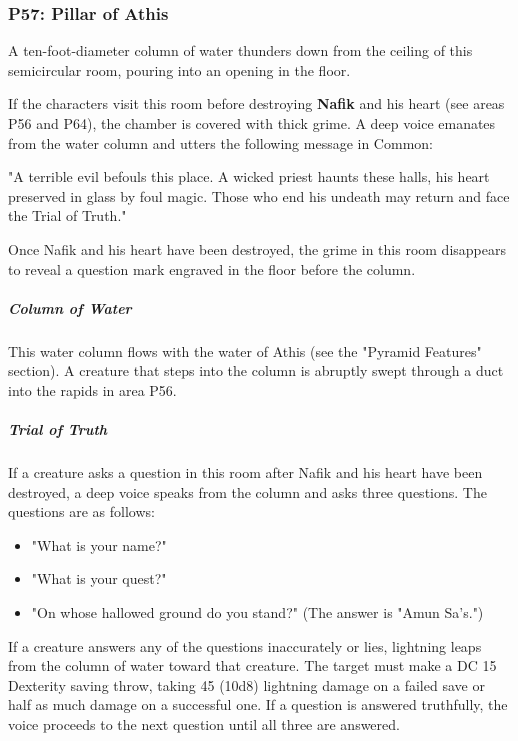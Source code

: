 \documentclass[10pt,a4paper,twoside,bg=print,twocolumn,openany,nodeprecatedcode]{dndbook}
\begin{document}
\subsubsection{P57: Pillar of Athis}
\begin{DndReadAloud}{}
A ten-foot-diameter column of water thunders down from the ceiling of this semicircular room, pouring into an opening in the floor.

\end{DndReadAloud}

If the characters visit this room before destroying \textbf{Nafik} and his heart (see areas P56 and P64), the chamber is covered with thick grime. A deep voice emanates from the water column and utters the following message in Common:

\begin{DndReadAloud}{}
"A terrible evil befouls this place. A wicked priest haunts these halls, his heart preserved in glass by foul magic. Those who end his undeath may return and face the Trial of Truth."

\end{DndReadAloud}

Once Nafik and his heart have been destroyed, the grime in this room disappears to reveal a question mark engraved in the floor before the column.

\subparagraph{Column of Water}
This water column flows with the water of Athis (see the "Pyramid Features" section). A creature that steps into the column is abruptly swept through a duct into the rapids in area P56.

\subparagraph{Trial of Truth}
If a creature asks a question in this room after Nafik and his heart have been destroyed, a deep voice speaks from the column and asks three questions. The questions are as follows:


\begin{itemize}
\item "What is your name?"
\item "What is your quest?"
\item "On whose hallowed ground do you stand?" (The answer is "Amun Sa's.")
\end{itemize}

If a creature answers any of the questions inaccurately or lies, lightning leaps from the column of water toward that creature. The target must make a DC 15 Dexterity saving throw, taking 45 (10d8) lightning damage on a failed save or half as much damage on a successful one. If a question is answered truthfully, the voice proceeds to the next question until all three are answered.
\end{document}
